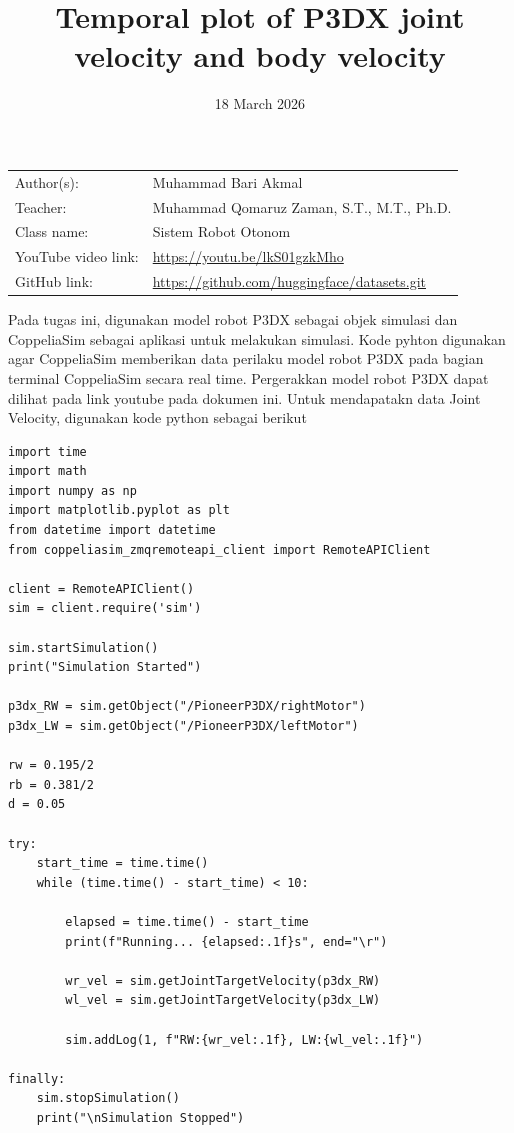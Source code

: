 \documentclass{article}
\title{Temporal plot of P3DX joint velocity and body velocity
}
\date{18 March 2026}
\begin{document}
\maketitle


\noindent\begin{tabular}{@{}ll}
    Author(s): & Muhammad Bari Akmal\\
     Teacher: &  Muhammad Qomaruz Zaman, S.T., M.T., Ph.D.\\
     Class name: & Sistem Robot Otonom\\
     YouTube video link: & \url{https://youtu.be/lkS01gzkMho} \\
     GitHub link: & \url{https://github.com/huggingface/datasets.git}
\end{tabular}
\vspace{2cm}


Pada tugas ini, digunakan model robot P3DX sebagai objek simulasi dan CoppeliaSim sebagai aplikasi untuk melakukan simulasi. Kode pyhton digunakan agar CoppeliaSim memberikan data perilaku model robot P3DX pada bagian terminal CoppeliaSim secara real time. Pergerakkan model robot P3DX dapat dilihat pada link youtube pada dokumen ini. Untuk mendapatakn data Joint Velocity, digunakan kode python sebagai berikut

\begin{verbatim}
import time
import math
import numpy as np
import matplotlib.pyplot as plt
from datetime import datetime
from coppeliasim_zmqremoteapi_client import RemoteAPIClient

client = RemoteAPIClient()
sim = client.require('sim')

sim.startSimulation()
print("Simulation Started")

p3dx_RW = sim.getObject("/PioneerP3DX/rightMotor")
p3dx_LW = sim.getObject("/PioneerP3DX/leftMotor")

rw = 0.195/2
rb = 0.381/2
d = 0.05

try:
    start_time = time.time()
    while (time.time() - start_time) < 10:
        
        elapsed = time.time() - start_time
        print(f"Running... {elapsed:.1f}s", end="\r")
        
        wr_vel = sim.getJointTargetVelocity(p3dx_RW)
        wl_vel = sim.getJointTargetVelocity(p3dx_LW)

        sim.addLog(1, f"RW:{wr_vel:.1f}, LW:{wl_vel:.1f}")

finally:
    sim.stopSimulation()
    print("\nSimulation Stopped")
\end{verbatim}
\end{document}
